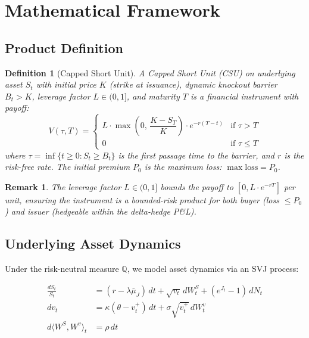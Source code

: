 \documentclass[12pt]{article}
\newtheorem{definition}{Definition}
\newtheorem{remark}{Remark}
\begin{document}
\section{Mathematical Framework}\label{sec:framework}

\subsection{Product Definition}

\begin{definition}[Capped Short Unit]
A Capped Short Unit (CSU) on underlying asset $S_t$ with initial price $K$ (strike at issuance),
dynamic knockout barrier $B_t > K$, leverage factor $L \in (0,1]$, and maturity $T$ is a
financial instrument with payoff:
\begin{equation}
    V(\tau, T) = \begin{cases}
        L \cdot \max\!\left(0,\, \dfrac{K - S_T}{K}\right) \cdot e^{-r(T-t)} & \text{if } \tau > T \\[6pt]
        0 & \text{if } \tau \leq T
    \end{cases}
\end{equation}
where $\tau = \inf\{t \geq 0 : S_t \geq B_t\}$ is the first passage time to the barrier, and
$r$ is the risk-free rate. The initial premium $P_0$ is the maximum loss: $\max \text{loss} = P_0$.
\end{definition}

\begin{remark}
The leverage factor $L \in (0,1]$ bounds the payoff to $[0, L \cdot e^{-rT}]$ per unit,
ensuring the instrument is a bounded-risk product for both buyer (loss $\leq P_0$) and
issuer (hedgeable within the delta-hedge P\&L).
\end{remark}

\subsection{Underlying Asset Dynamics}

Under the risk-neutral measure $\mathbb{Q}$, we model asset dynamics via an SVJ process:

\begin{align}
    \frac{dS_t}{S_t} &= (r - \lambda \bar{\mu}_J)\,dt + \sqrt{v_t}\,dW_t^S
                        + (e^{J_t} - 1)\,dN_t \label{eq:price} \\
    dv_t &= \kappa(\theta - v_t^+)\,dt + \sigma\sqrt{v_t^+}\,dW_t^v \label{eq:var} \\
    d\langle W^S, W^v \rangle_t &= \rho\,dt \label{eq:corr}
\end{align}
\end{document}
